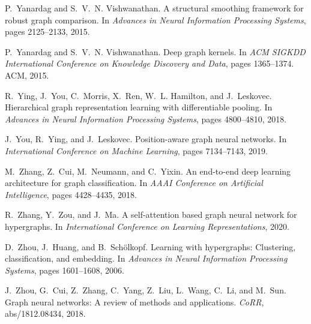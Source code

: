 \documentclass{article}
\theoremstyle{definition}
\begin{document}
\begin{thebibliography}{125}
	P.~Yanardag and S.~V.~N. Vishwanathan.
	\newblock A structural smoothing framework for robust graph comparison.
	\newblock In \emph{Advances in Neural Information Processing Systems}, pages
	2125--2133, 2015{}.
	
	P.~Yanardag and S.~V.~N. Vishwanathan.
	\newblock Deep graph kernels.
	\newblock In \emph{ACM SIGKDD International Conference on Knowledge Discovery
		and Data}, pages 1365--1374. ACM, 2015{}.
	
	R.~Ying, J.~You, C.~Morris, X.~Ren, W.~L. Hamilton, and J.~Leskovec.
	\newblock Hierarchical graph representation learning with differentiable
	pooling.
	\newblock In \emph{Advances in Neural Information Processing Systems}, pages
	4800--4810, 2018.
	
	J.~You, R.~Ying, and J.~Leskovec.
	\newblock Position-aware graph neural networks.
	\newblock In \emph{International Conference on Machine Learning}, pages
	7134--7143, 2019.
	
	M.~Zhang, Z.~Cui, M.~Neumann, and C.~Yixin.
	\newblock An end-to-end deep learning architecture for graph classification.
	\newblock In \emph{AAAI Conference on Artificial Intelligence}, pages
	4428--4435, 2018.
	
	R.~Zhang, Y.~Zou, and J.~Ma.
	 {A} self-attention based graph neural network for
	hypergraphs.
	\newblock In \emph{International Conference on Learning Representations}, 2020.
	
	D.~Zhou, J.~Huang, and B.~Sch{\"{o}}lkopf.
	\newblock Learning with hypergraphs: Clustering, classification, and embedding.
	\newblock In \emph{Advances in Neural Information Processing Systems}, pages
	1601--1608, 2006.
	
	J.~Zhou, G.~Cui, Z.~Zhang, C.~Yang, Z.~Liu, L.~Wang, C.~Li, and M.~Sun.
	\newblock Graph neural networks: A review of methods and applications.
	\newblock \emph{CoRR}, abs/1812.08434, 2018.
	
\end{thebibliography}
\end{document}

